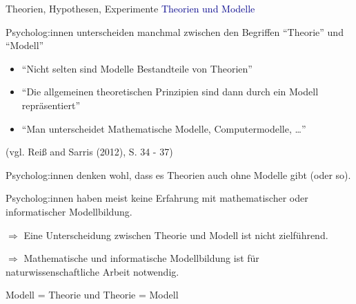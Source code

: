 \documentclass[
  8pt,
  ignorenonframetext,
]{beamer}
\providecommand{\tightlist}{%
  \setlength{\itemsep}{0pt}\setlength{\parskip}{0pt}}
\begin{document}
\begin{frame}{Theorien, Hypothesen, Experimente}
\protect\hypertarget{theorien-hypothesen-experimente-1}{}
\textcolor{darkblue}{Theorien und Modelle} \small {}

Psycholog:innen unterscheiden manchmal zwischen den Begriffen
``Theorie'' und ``Modell''

\begin{itemize}
\tightlist
\item
  ``Nicht selten sind Modelle Bestandteile von Theorien''
\item
  ``Die allgemeinen theoretischen Prinzipien sind dann durch ein Modell
  repräsentiert''
\item
  ``Man unterscheidet Mathematische Modelle, Computermodelle, \ldots{}''
\end{itemize}

\flushright

(vgl. Reiß and Sarris (2012), S. 34 - 37)

\justifying

Psycholog:innen denken wohl, dass es Theorien auch ohne Modelle gibt
(oder so).

Psycholog:innen haben meist keine Erfahrung mit mathematischer oder
informatischer Modellbildung.

\(\Rightarrow\) Eine Unterscheidung zwischen Theorie und Modell ist
nicht zielführend.

\(\Rightarrow\) Mathematische und informatische Modellbildung ist für
naturwissenschaftliche Arbeit notwendig.

\large
\center

Modell = Theorie und Theorie = Modell
\end{frame}
\end{document}
